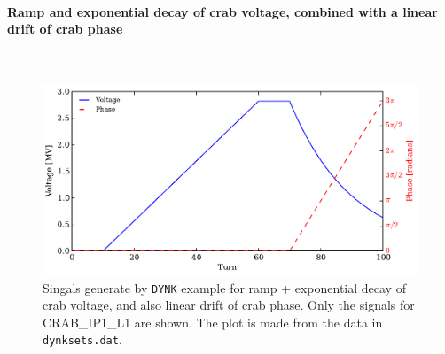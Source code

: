 \paragraph{Ramp and exponential decay of crab voltage, combined with a linear drift of crab phase}~\\
\begin{figure}
  \centering
  \includegraphics{figures/fail_voltagePhase2v2}
  \caption{Singals generate by \texttt{DYNK} example for ramp + exponential decay of crab voltage, and also linear drift of crab phase. Only the signals for CRAB\_IP1\_L1 are shown. The plot is made from the data in \texttt{dynksets.dat}.}
  \label{fig:DYNK_fail}
\end{figure}

